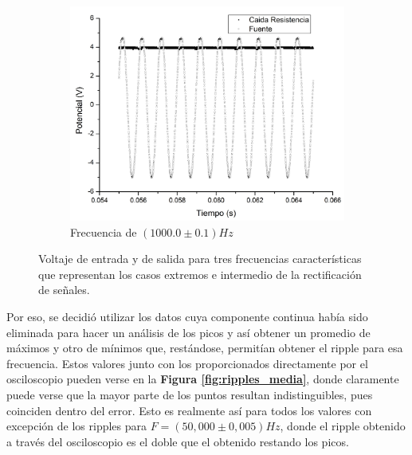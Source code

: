 \documentclass[11pt,a4paper]{article}
\begin{document}
\begin{figure}[h]
\begin{subfigure}{0.33\textwidth}
\includegraphics[scale=0.23]{Rectificacion_1000hz}
  \caption{Frecuencia de $(1000.0\pm0.1)Hz$}
  \label{subfig:rec_1000}
\end{subfigure}
  \caption{Voltaje de entrada y de salida para tres frecuencias características que representan los casos extremos e intermedio de la rectificación de señales. }
  \label{fig:rectificaciones}
\end{figure}

\newpage
Por eso, se decidió utilizar los datos cuya componente continua había sido eliminada para hacer un análisis de los picos y así obtener un promedio de máximos y otro de mínimos que, restándose, permitían obtener el ripple para esa frecuencia. Estos valores junto con los proporcionados directamente por el osciloscopio pueden verse en la \textbf{Figura \ref{fig:ripples_media}}, donde claramente puede verse que la mayor parte de los puntos resultan indistinguibles, pues coinciden dentro del error. Esto es realmente así para todos los valores con excepción de los ripples para $F = (50,000 \pm 0,005)Hz$, donde el ripple obtenido a través del osciloscopio es el doble que el obtenido restando los picos. 
\end{document}
